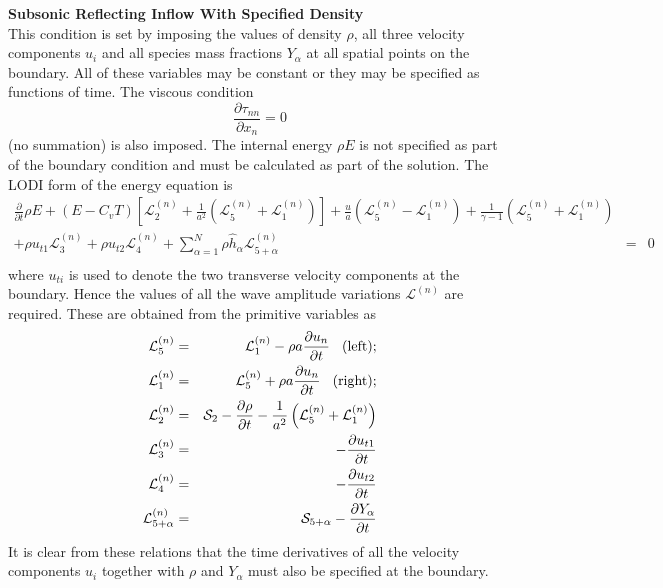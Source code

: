 \documentclass[dvips]{article}
\begin{document}
\vspace{2mm}
\noindent
{\bf Subsonic Reflecting Inflow With Specified Density}\\
This condition is set by imposing the values of density $\rho$, all three
velocity components $u_{i}$ and all species mass fractions $Y_{\alpha}$ at all
spatial points on the boundary.  All of these variables may be constant or
they may be specified as functions of time.  The viscous condition
\begin{equation}
\frac{\partial \tau_{nn}}{\partial x_{n}} = 0
\end{equation}
(no summation) is also imposed.
The internal energy $\rho E$ is not specified as part of the boundary condition
and must be calculated as part of the solution.  The LODI form of the
energy equation is
\begin{eqnarray}
\frac{\partial}{\partial t}\rho E
+\left(E-C_{v}T\right)\left[{\mathcal L}^{(n)}_{2} +
    \frac{1}{a^{2}}\left({\mathcal L}^{(n)}_{5}
                        +{\mathcal L}^{(n)}_{1}\right)\right]
+\frac{u}{a}\left({\mathcal L}^{(n)}_{5}
                 -{\mathcal L}^{(n)}_{1}\right)
+\frac{1}{\gamma-1}\left({\mathcal L}^{(n)}_{5}
                        +{\mathcal L}^{(n)}_{1}\right)
& & \nonumber \\
+\rho u_{t1} {\mathcal L}^{(n)}_{3}
+\rho u_{t2} {\mathcal L}^{(n)}_{4}
+\sum_{\alpha=1}^{N}\rho \hat{h}_{\alpha} {\mathcal L}^{(n)}_{5+\alpha}
& = & 0 \nonumber\\
\end{eqnarray}
where $u_{ti}$ is used to denote the two transverse velocity components at the
boundary.  Hence the values of all the wave amplitude variations
${\mathcal L}^{(n)}$
are required.  These are obtained from the primitive variables as
\begin{eqnarray}
{\mathcal L}^{(n)}_{5} & = &
{\mathcal L}^{(n)}_{1} - \rho a\frac{\partial u_{n}}{\partial t}
\hspace{3mm}{\rm (left);}
\nonumber \\
{\mathcal L}^{(n)}_{1} & = &
{\mathcal L}^{(n)}_{5} + \rho a\frac{\partial u_{n}}{\partial t}
\hspace{3mm}{\rm (right);}
\nonumber \\
{\mathcal L}^{(n)}_{2} & = &
{\mathcal S}_{2} -\frac{\partial \rho}{\partial t}
-\frac{1}{a^{2}}\left({\mathcal L}^{(n)}_{5}+{\mathcal L}^{(n)}_{1}\right)
\nonumber \\
{\mathcal L}^{(n)}_{3} & = &
-\frac{\partial u_{t1}}{\partial t}
\nonumber \\
{\mathcal L}^{(n)}_{4} & = &
-\frac{\partial u_{t2}}{\partial t}
\nonumber \\
{\mathcal L}^{(n)}_{5+\alpha} & = &
{\mathcal S}_{5+\alpha}-\frac{\partial Y_{\alpha}}{\partial t}
\label{NSCBCDENS}
\end{eqnarray}
It is clear from these relations that the time derivatives of all the
velocity components $u_{i}$ together with 
$\rho$ and $Y_{\alpha}$ must also be specified at the boundary.
\end{document}
